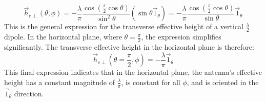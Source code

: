 \begin{equation}
    \vec{h}_{e\perp}(\theta, \phi) = -\frac{\lambda}{\pi} \frac{\cos(\frac{\pi}{2}\cos\theta)}{\sin^2\theta} (\sin\theta \vec{1}_\theta) = -\frac{\lambda}{\pi} \frac{\cos(\frac{\pi}{2}\cos\theta)}{\sin\theta} \vec{1}_\theta
    \label{eq:he_perp_general}
\end{equation}
\vspace{0.5em}
This is the general expression for the transverse effective height of a vertical $\frac{\lambda}{2}$ dipole. In the horizontal plane, where $\theta = \frac{\pi}{2}$, the expression simplifies significantly. The transverse effective height in the horizontal plane is therefore:
\begin{equation}
    \vec{h}_{e\perp}\left(\theta=\frac{\pi}{2}, \phi\right) = -\frac{\lambda}{\pi} \vec{1}_\theta
    \label{eq:he_perp_horizontal}
\end{equation}
\vspace{0.5em}
This final expression indicates that in the horizontal plane, the antenna's effective height has a constant magnitude of $\frac{\lambda}{\pi}$, is constant for all $\phi$, and is oriented in the $\vec{1}_\theta$ direction.

